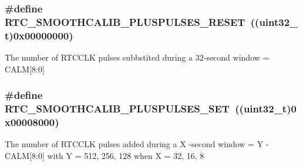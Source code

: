 \subsubsection[{\texorpdfstring{R\+T\+C\+\_\+\+S\+M\+O\+O\+T\+H\+C\+A\+L\+I\+B\+\_\+\+P\+L\+U\+S\+P\+U\+L\+S\+E\+S\+\_\+\+R\+E\+S\+ET}{RTC_SMOOTHCALIB_PLUSPULSES_RESET}}]{\setlength{\rightskip}{0pt plus 5cm}\#define R\+T\+C\+\_\+\+S\+M\+O\+O\+T\+H\+C\+A\+L\+I\+B\+\_\+\+P\+L\+U\+S\+P\+U\+L\+S\+E\+S\+\_\+\+R\+E\+S\+ET~((uint32\+\_\+t)0x00000000)}\hypertarget{group___r_t_c_ex___smooth__calib___plus__pulses___definitions_gaed8a5d1a5400612bde6fe30b32f350e7}{}\label{group___r_t_c_ex___smooth__calib___plus__pulses___definitions_gaed8a5d1a5400612bde6fe30b32f350e7}
The number of R\+T\+C\+C\+LK pulses subbstited during a 32-\/second window = C\+A\+LM\mbox{[}8\+:0\mbox{]} 
\subsubsection[{\texorpdfstring{R\+T\+C\+\_\+\+S\+M\+O\+O\+T\+H\+C\+A\+L\+I\+B\+\_\+\+P\+L\+U\+S\+P\+U\+L\+S\+E\+S\+\_\+\+S\+ET}{RTC_SMOOTHCALIB_PLUSPULSES_SET}}]{\setlength{\rightskip}{0pt plus 5cm}\#define R\+T\+C\+\_\+\+S\+M\+O\+O\+T\+H\+C\+A\+L\+I\+B\+\_\+\+P\+L\+U\+S\+P\+U\+L\+S\+E\+S\+\_\+\+S\+ET~((uint32\+\_\+t)0x00008000)}\hypertarget{group___r_t_c_ex___smooth__calib___plus__pulses___definitions_ga53eabbf840a8631b955636bbfaf9bc83}{}\label{group___r_t_c_ex___smooth__calib___plus__pulses___definitions_ga53eabbf840a8631b955636bbfaf9bc83}
The number of R\+T\+C\+C\+LK pulses added during a X -\/second window = Y -\/ C\+A\+LM\mbox{[}8\+:0\mbox{]} with Y = 512, 256, 128 when X = 32, 16, 8 